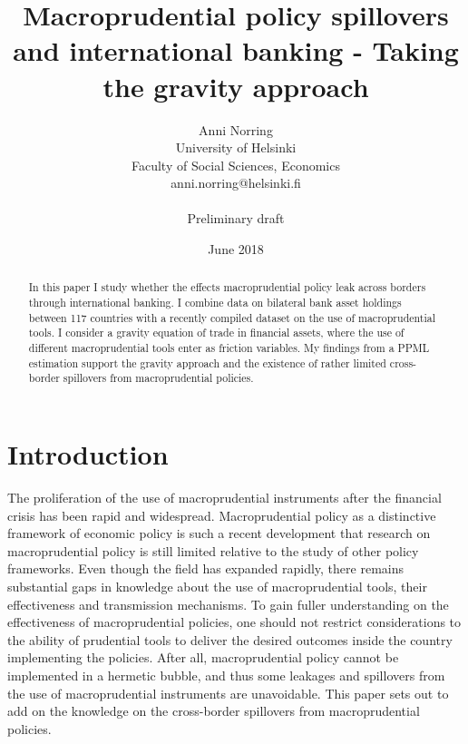 \documentclass[12pt,a4paper]{article}
\title{Macroprudential policy spillovers and international banking - Taking the gravity approach}
\author{Anni Norring\\University of Helsinki\\Faculty of Social Sciences, Economics\\anni.norring@helsinki.fi\\ \\Preliminary draft}
\date{June 2018}
\begin{document}
\maketitle

\begin{abstract}
\noindent In this paper I study whether the effects macroprudential policy leak across borders through international banking. I combine data on bilateral bank asset holdings between 117 countries with a recently compiled dataset on the use of macroprudential tools. I consider a gravity equation of trade in financial assets, where the use of different macroprudential tools enter as friction variables. My findings from a PPML estimation support the gravity approach and the existence of rather limited cross-border spillovers from macroprudential policies. 
\end{abstract}

\thispagestyle{empty}
\cleardoublepage

\newpage
\thispagestyle{empty}
\tableofcontents

\newpage
\thispagestyle{empty}
\listoffigures
\listoftables

\newpage
{}

\section{Introduction}

The proliferation of the use of macroprudential instruments after the financial crisis has been rapid and widespread. Macroprudential policy as a distinctive framework of economic policy is such a recent development that research on macroprudential policy is still limited relative to the study of other policy frameworks. Even though the field has expanded rapidly, there remains substantial gaps in knowledge about the use of macroprudential tools, their effectiveness and transmission mechanisms. To gain fuller understanding on the effectiveness of macroprudential policies, one should not restrict considerations to the ability of prudential tools to deliver the desired outcomes inside the country implementing the policies. After all, macroprudential policy cannot be implemented in a hermetic bubble, and thus some leakages and spillovers from the use of macroprudential instruments are unavoidable. This paper sets out to add on the knowledge on the cross-border spillovers from macroprudential policies. 
\end{document}
